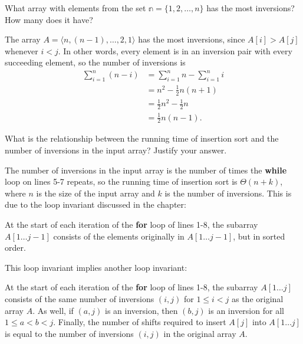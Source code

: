 \documentclass[Chapter02]{subfiles}
\begin{document}
\begin{problems}
\begin{problems}
			\item What array with elements from the set $\mathbb{n} = \{1, 2, \dots, n\}$ has the most inversions? How many does it have?
			\begin{answer}
				The array $A = \langle n, (n - 1), \dots, 2, 1 \rangle$ has the most inversions, since $A[i] > A[j]$ whenever $i < j$. In other words, every element is in an inversion pair with every succeeding element, so the number of inversions is
				\begin{align*}
					\sum_{i = 1}^n (n - i) &= \sum_{i = 1}^n n - \sum_{i = 1}^n i\\
						&= n^2 - \frac{1}{2}n(n + 1)\\
						&= \frac{1}{2}n^2 - \frac{1}{2}n\\
						&= \frac{1}{2}n(n - 1).
				\end{align*}
			\end{answer}
			
			\item What is the relationship between the running time of insertion sort and the number of inversions in the input array? Justify your answer.
			\begin{answer}
				The number of inversions in the input array is the number of times the \textbf{while} loop on lines 5-7 repeats, so the running time of insertion sort is $\Theta(n + k)$, where $n$ is the size of the input array and $k$ is the number of inversions. This is due to the loop invariant discussed in the chapter:
				\begin{addmargin}[2em]{2em}
					At the start of each iteration of the \textbf{for} loop of lines 1-8, the subarray $A[1 \dots j-1]$ consists of the elements originally in $A[1 \dots j-1]$, but in sorted order.
				\end{addmargin}

				This loop invariant implies another loop invariant:
				\begin{addmargin}[2em]{2em}
					At the start of each iteration of the \textbf{for} loop of lines 1-8, the subarray $A[1 \dots j]$ consists of the same number of inversions $(i,j)$ for $1 \leq i < j$ as the original array $A$. As well, if $(a,j)$ is an inversion, then $(b,j)$ is an inversion for all $1 \leq a < b < j$. Finally, the number of shifts required to insert $A[j]$ into $A[1 \dots j]$ is equal to the number of inversions $(i,j)$ in the original array $A$.
				\end{addmargin}


\end{answer}
\end{problems}
\end{problems}
\end{document}
